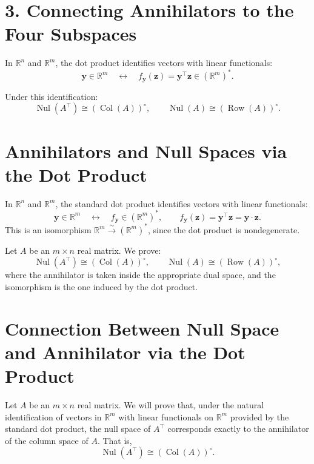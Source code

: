\documentclass[11pt]{article}
\newcommand{\nul}{\operatorname{Nul}}
\newcommand{\col}{\operatorname{Col}}
\newcommand{\row}{\operatorname{Row}}
\newcommand{\R}{\mathbb{R}}
\begin{document}
\section*{3. Connecting Annihilators to the Four Subspaces}

In $ \mathbb{R}^n $ and $ \mathbb{R}^m $, the dot product identifies vectors with linear functionals:
\[
\mathbf{y} \in \mathbb{R}^m \quad \longleftrightarrow \quad f_{\mathbf{y}}(\mathbf{z}) = \mathbf{y}^\top \mathbf{z} \in (\mathbb{R}^m)^*.
\]

Under this identification:
\[
\operatorname{Nul}(A^\top) \cong (\operatorname{Col}(A))^\circ, \qquad
\operatorname{Nul}(A) \cong (\operatorname{Row}(A))^\circ.
\]





\section*{Annihilators and Null Spaces via the Dot Product}

In $\mathbb{R}^n$ and $\mathbb{R}^m$, the standard dot product identifies vectors with linear functionals:
\[
\mathbf{y} \in \mathbb{R}^m \quad \longleftrightarrow \quad f_{\mathbf{y}} \in (\mathbb{R}^m)^*, \qquad 
f_{\mathbf{y}}(\mathbf{z}) = \mathbf{y}^\top \mathbf{z} = \mathbf{y} \cdot \mathbf{z}.
\]
This is an isomorphism $\mathbb{R}^m \xrightarrow{\sim} (\mathbb{R}^m)^*$, since the dot product is nondegenerate.

Let $A$ be an $m \times n$ real matrix. We prove:
\[
\nul(A^\top) \cong (\col(A))^\circ, \qquad
\nul(A) \cong (\row(A))^\circ,
\]
where the annihilator is taken inside the appropriate dual space, and the isomorphism is the one induced by the dot product.

\medskip







\section*{Connection Between Null Space and Annihilator via the Dot Product}

Let $A$ be an $m \times n$ real matrix. We will prove that, under the natural identification of vectors in $\R^m$ with linear functionals on $\R^m$ provided by the standard dot product, the null space of $A^\top$ corresponds exactly to the annihilator of the column space of $A$. That is,
\[
\nul(A^\top) \cong (\col(A))^\circ.
\]
\end{document}
